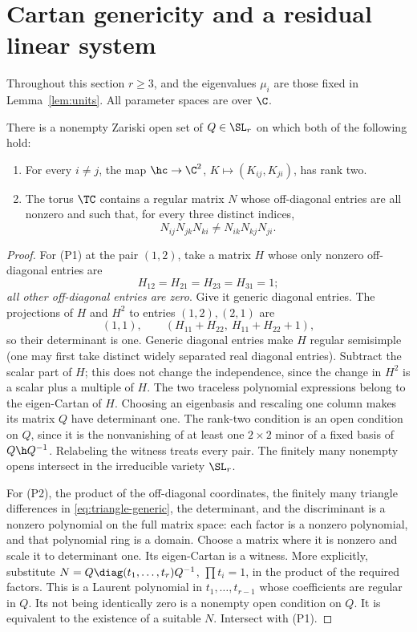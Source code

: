 \section{Cartan genericity and a residual linear system}\label{sec:linear}
Throughout this section $r\geq3$, and the eigenvalues $\mu_i$ are those
fixed in Lemma~\ref{lem:units}. All parameter spaces are over $\C$.

\begin{lemma}\label{lem:P}
There is a nonempty Zariski open set of $Q\in\SL_r$ on which both of the
following hold:
\begin{enumerate}[label=(P\arabic*),leftmargin=3em]
\item For every $i\ne j$, the map $\hc\to\C^2$,
$K\mapsto(K_{ij},K_{ji})$, has rank two.
\item The torus $\TC$ contains a regular matrix $N$ whose off-diagonal
entries are all nonzero and such that, for every three distinct indices,
\begin{equation}\label{eq:triangle-generic}
 N_{ij}N_{jk}N_{ki}\ne N_{ik}N_{kj}N_{ji}.
\end{equation}
\end{enumerate}
\end{lemma}
\begin{proof}
For (P1) at the pair $(1,2)$, take a matrix $H$ whose only nonzero
off-diagonal entries are
\[
 H_{12}=H_{21}=H_{23}=H_{31}=1;
\]
\emph{all other off-diagonal entries are zero}. Give it generic diagonal
entries. The projections of $H$ and $H^2$ to entries $(1,2),(2,1)$ are
\[
 (1,1),\qquad(H_{11}+H_{22},\ H_{11}+H_{22}+1),
\]
so their determinant is one. Generic diagonal entries make $H$ regular
semisimple (one may first take distinct widely separated real diagonal
entries). Subtract the scalar part of $H$; this does not change the
independence, since the change in $H^2$ is a scalar plus a multiple of $H$.
The two traceless polynomial expressions belong to the eigen-Cartan of
$H$. Choosing an eigenbasis and rescaling one column makes its matrix
$Q$ have determinant one. The rank-two condition is an open condition on
$Q$, since it is the nonvanishing of at least one $2\times2$ minor of a
fixed basis of $Q\h Q^{-1}$. Relabeling the witness treats every pair.
The finitely many nonempty opens intersect in the irreducible variety
$\SL_r$.

For (P2), the product of the off-diagonal coordinates, the finitely many
triangle differences in \eqref{eq:triangle-generic}, the determinant,
and the discriminant is a nonzero polynomial on the full matrix space:
each factor is a nonzero polynomial, and that polynomial ring is a domain.
Choose a matrix where it is nonzero and scale it to determinant one.
Its eigen-Cartan is a witness. More explicitly, substitute
$N=Q\diag(t_1,\ldots,t_r)Q^{-1}$, $\prod t_i=1$, in the product of the
required factors. This is a Laurent polynomial in $t_1,\ldots,t_{r-1}$
whose coefficients are regular in $Q$. Its not being identically zero is
a nonempty open condition on $Q$. It is equivalent to the existence of
a suitable $N$. Intersect with (P1).
\end{proof}

